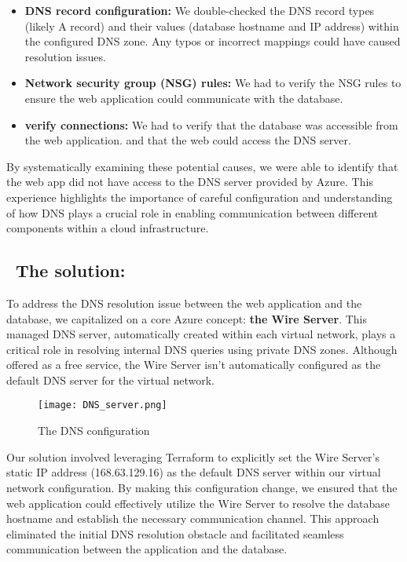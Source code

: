 \begin{itemize}
    \item \textbf{DNS record configuration:} We double-checked the DNS record types (likely A record) and their values (database hostname and IP address) within the configured DNS zone. Any typos or incorrect mappings could have caused resolution issues.
    \item \textbf{Network security group (NSG) rules:} We had to verify the NSG rules to ensure the web application could communicate with the database.
    \item \textbf{verify connections:} We had to verify that the database was accessible from the web application. and that the web could access the DNS server.
\end{itemize}
By systematically examining these potential causes, we were able to identify that the web app did not have access to the DNS server provided by Azure. This experience highlights the importance of careful configuration and understanding of how DNS plays a crucial role in enabling communication between different components within a cloud infrastructure.
\subsection*{ \textbullet\ The solution:}
To address the DNS resolution issue between the web application and the database, we capitalized on a core Azure concept: \textbf{the Wire Server}. This managed DNS server, automatically created within each virtual network, plays a critical role in resolving internal DNS queries using private DNS zones. Although offered as a free service, the Wire Server isn't automatically configured as the default DNS server for the virtual network.

\begin{figure}[htpb]
    \centering
    \texttt{[image: DNS\_server.png]}
    \caption{The DNS configuration}
    \label{fig:dns_configuration}
\end{figure}

Our solution involved leveraging Terraform to explicitly set the Wire Server's static IP address (168.63.129.16) as the default DNS server within our virtual network configuration. By making this configuration change, we ensured that the web application could effectively utilize the Wire Server to resolve the database hostname and establish the necessary communication channel. This approach eliminated the initial DNS resolution obstacle and facilitated seamless communication between the application and the database.

